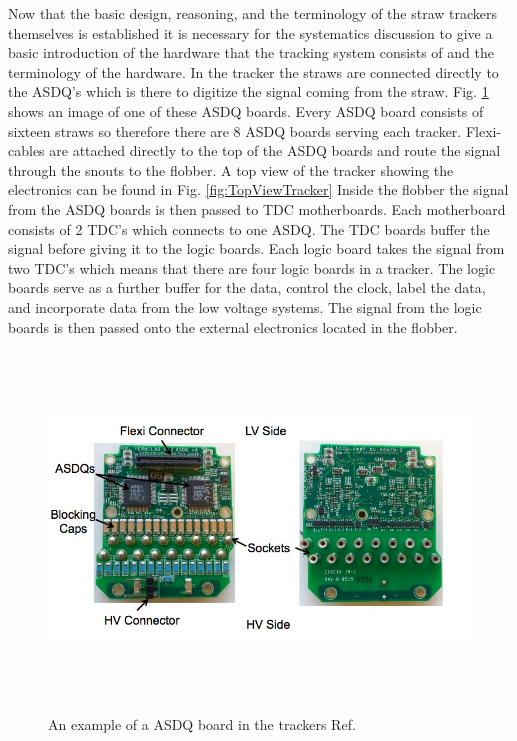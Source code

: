 \documentclass[./Thesis]{subfiles}
\begin{document}
	Now that the basic design, reasoning,  and the terminology of the straw trackers themselves is established it is necessary for the systematics discussion to give a basic introduction of the hardware that the tracking system consists of and the terminology of the hardware. In the tracker the straws are connected directly to the ASDQ's which is there to digitize the signal coming from the straw. Fig. \ref{fig:ASDQ} shows an image of one of these ASDQ boards. Every ASDQ board consists of  sixteen straws so therefore there are 8 ASDQ boards serving each tracker.   Flexi-cables are attached directly to the top of the ASDQ boards and route the signal through the snouts to the flobber. A top view of the tracker showing the electronics can be found in Fig. \ref{fig:TopViewTracker} Inside the flobber the signal from the ASDQ boards is then passed to TDC  motherboards. Each motherboard consists of 2 TDC's which connects to one ASDQ. The TDC boards buffer the signal before giving it to the logic boards. Each logic board takes the signal from two TDC's which means that there are four logic boards in a tracker. The logic boards serve as a further buffer for the data,  control the clock,  label the data,  and incorporate data from the low voltage systems. The signal from the logic boards is then passed onto the external electronics located in the flobber. 
	
\begin{figure}
	\centerline{\includegraphics[height=95mm]{ASDQ.jpeg}}
	\caption[Straw Tracker ASDQ]{ An example of a ASDQ board in the trackers Ref. \cite{jmottASDQ}
	}
	\label{fig:ASDQ}
\end{figure} 
	
\end{document}
